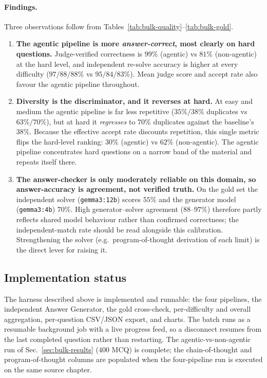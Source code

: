 \paragraph{Findings.} Three observations follow from
Tables~\ref{tab:bulk-quality}--\ref{tab:bulk-gold}.
\begin{enumerate}
  \item \textbf{The agentic pipeline is more \emph{answer-correct}, most clearly
        on hard questions.} Judge-verified correctness is $99\%$ (agentic) vs
        $81\%$ (non-agentic) at the hard level, and independent re-solve accuracy
        is higher at every difficulty ($97/88/88\%$ vs $95/84/83\%$). Mean judge
        score and accept rate also favour the agentic pipeline throughout.
  \item \textbf{Diversity is the discriminator, and it reverses at hard.} At easy
        and medium the agentic pipeline is far less repetitive ($35\%/38\%$
        duplicates vs $63\%/70\%$), but at hard it \emph{regresses} to $70\%$
        duplicates against the baseline's $38\%$. Because the effective accept rate
        discounts repetition, this single metric flips the hard-level ranking:
        $30\%$ (agentic) vs $62\%$ (non-agentic). The agentic pipeline concentrates
        hard questions on a narrow band of the material and repeats itself there.
  \item \textbf{The answer-checker is only moderately reliable on this domain, so
        answer-accuracy is agreement, not verified truth.} On the gold set the
        independent solver (\texttt{gemma3:12b}) scores $55\%$ and the generator
        model (\texttt{gemma3:4b}) $70\%$. High generator--solver agreement
        ($88$--$97\%$) therefore partly reflects shared model behaviour rather than
        confirmed correctness; the independent-match rate should be read alongside
        this calibration. Strengthening the solver (e.g.\ program-of-thought
        derivation of each limit) is the direct lever for raising it.
\end{enumerate}

\subsection{Implementation status}
\label{sec:bulk-status}

The harness described above is implemented and runnable: the four pipelines, the
independent Answer Generator, the gold cross-check, per-difficulty and overall
aggregation, per-question CSV/JSON export, and charts. The batch runs as a
resumable background job with a live progress feed, so a disconnect resumes from
the last completed question rather than restarting. The agentic-vs-non-agentic run
of Sec.~\ref{sec:bulk-results} ($400$ MCQ) is complete; the chain-of-thought and
program-of-thought columns are populated when the four-pipeline run is executed on
the same source chapter.

